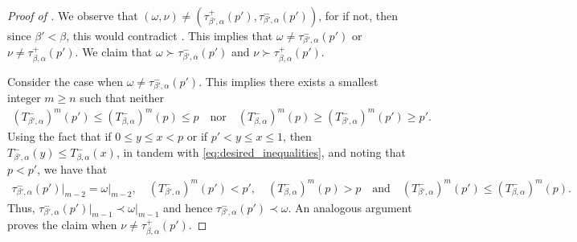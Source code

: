 \documentclass[a4paper,reqno,10pt]{amsart}
\begin{document}
\begin{proof}[{Proof of }]
We observe that $(\omega, \nu) \neq (\tau_{\beta', \alpha}^{+}(p'), \tau_{\beta', \alpha}^{-}(p'))$, for if not, then since $\beta' < \beta$, this would contradict . This implies that $\omega \neq \tau_{\beta', \alpha}^{-}(p')$ or $\nu \neq \tau_{\beta, \alpha}^{+}(p')$.  We claim that $\omega \succ \tau_{\beta', \alpha}^{-}(p')$ and $\nu \succ \tau_{\beta, \alpha}^{+}(p')$.

Consider the case when $\omega \neq \tau_{\beta', \alpha}^{-}(p')$. This implies there exists a smallest integer $m \geq n$ such that neither
   \begin{align*}
        (T_{\beta', \alpha}^{-})^{m}(p') \leq (T_{\beta, \alpha}^{-})^{m}(p) \leq p
        \quad \text{nor} \quad
        (T_{\beta, \alpha}^{-})^{m}(p) \geq (T_{\beta', \alpha}^{-})^{m}(p') \geq p'.
    \end{align*}
Using the fact that if $0 \leq y \leq x < p$ or if $p' < y \leq x \leq 1$, then $T^{-}_{\beta', \alpha}(y) \leq T^{-}_{\beta, \alpha}(x)$, in tandem with \eqref{eq:desired_inequalities}, and noting that $p<p'$, we have that
    \begin{align*}
        \tau_{\beta', \alpha}^{-}(p')\vert_{m-2}=\omega\vert_{m-2},
        \quad
        (T^{-}_{\beta',\alpha})^{m}(p')<p',
        \quad
        (T^{-}_{\beta,\alpha})^{m}(p) > p
        \quad \text{and} \quad
        (T^{-}_{\beta',\alpha})^{m}(p')\leq (T^{-}_{\beta,\alpha})^{m}(p).
    \end{align*}
Thus, $\tau_{\beta', \alpha}^{-}(p')\vert_{m-1} \prec \omega\vert_{m-1}$ and hence $\tau_{\beta', \alpha}^{-}(p') \prec \omega$. An analogous argument proves the claim when $\nu \neq \tau_{\beta, \alpha}^{+}(p')$.


\end{proof}
\end{document}
